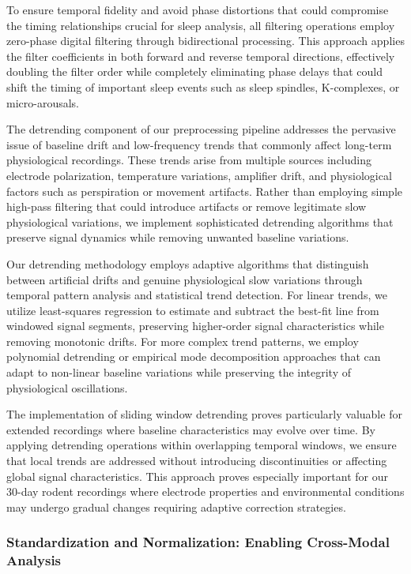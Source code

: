 \documentclass[a4paper,12pt,twoside]{article}
\begin{document}
To ensure temporal fidelity and avoid phase distortions that could compromise the timing relationships crucial for sleep analysis, all filtering operations employ zero-phase digital filtering through bidirectional processing. This approach applies the filter coefficients in both forward and reverse temporal directions, effectively doubling the filter order while completely eliminating phase delays that could shift the timing of important sleep events such as sleep spindles, K-complexes, or micro-arousals.

The detrending component of our preprocessing pipeline addresses the pervasive issue of baseline drift and low-frequency trends that commonly affect long-term physiological recordings. These trends arise from multiple sources including electrode polarization, temperature variations, amplifier drift, and physiological factors such as perspiration or movement artifacts. Rather than employing simple high-pass filtering that could introduce artifacts or remove legitimate slow physiological variations, we implement sophisticated detrending algorithms that preserve signal dynamics while removing unwanted baseline variations.

Our detrending methodology employs adaptive algorithms that distinguish between artificial drifts and genuine physiological slow variations through temporal pattern analysis and statistical trend detection. For linear trends, we utilize least-squares regression to estimate and subtract the best-fit line from windowed signal segments, preserving higher-order signal characteristics while removing monotonic drifts. For more complex trend patterns, we employ polynomial detrending or empirical mode decomposition approaches that can adapt to non-linear baseline variations while preserving the integrity of physiological oscillations.

The implementation of sliding window detrending proves particularly valuable for extended recordings where baseline characteristics may evolve over time. By applying detrending operations within overlapping temporal windows, we ensure that local trends are addressed without introducing discontinuities or affecting global signal characteristics. This approach proves especially important for our 30-day rodent recordings where electrode properties and environmental conditions may undergo gradual changes requiring adaptive correction strategies.

\subsubsection{Standardization and Normalization: Enabling Cross-Modal Analysis}
\end{document}
